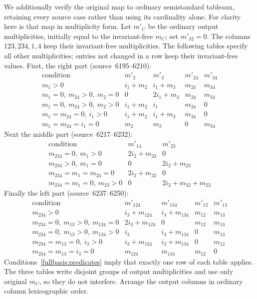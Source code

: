 We additionally verify the original map to ordinary semistandard
tableaux, retaining every source case rather than using its cardinality
alone.  For clarity here is that map in multiplicity form.  Let $m'_C$
be the ordinary output multiplicities, initially equal to the
invariant-free $m_C$; set $m'_{32}=0$.  The columns $123,234,1,4$ keep
their invariant-free multiplicities.  The following tables specify
all other multiplicities; entries not changed in a row keep their
invariant-free values.  First, the right part (source~6195--6210):
\[
\begin{array}{c|cc|cc}
\text{condition}&m'_2&m'_3&m'_{24}&m'_{34}\\\hline
m_1>0&i_1+m_2&i_1+m_3&m_{24}&m_{34}\\
m_1=0,\ m_{24}>0,\ m_2=0&0&2i_1+m_3&m_{24}&m_{34}\\
m_1=0,\ m_{24}>0,\ m_2>0&i_1+m_2&i_1&m_{24}&0\\
m_1=m_{24}=0,\ i_1>0&i_1+m_2&i_1+m_3&m_{34}&0\\
m_1=m_{24}=i_1=0&m_2&m_3&0&m_{34}
\end{array}
\]
Next the middle part (source~6217--6232):
\[
\begin{array}{c|cc}
\text{condition}&m'_{14}&m'_{23}\\\hline
m_{234}=0,\ m_1>0&2i_2+m_{23}&0\\
m_{234}>0,\ m_1=0&0&2i_2+m_{23}\\
m_{234}=m_1=m_{23}=0&2i_2+m_{32}&0\\
m_{234}=m_1=0,\ m_{23}>0&0&2i_2+m_{32}+m_{23}
\end{array}
\]
Finally the left part (source~6237--6250):
\[
\begin{array}{c|cc|cc}
\text{condition}&m'_{124}&m'_{134}&m'_{12}&m'_{13}\\\hline
m_{234}>0&i_3+m_{124}&i_3+m_{134}&m_{12}&m_{13}\\
m_{234}=0,\ m_{13}>0,\ m_{134}=0&2i_3+m_{124}&0&m_{12}&m_{13}\\
m_{234}=0,\ m_{13}>0,\ m_{134}>0&i_3&i_3+m_{134}&0&m_{13}\\
m_{234}=m_{13}=0,\ i_3>0&i_3+m_{124}&i_3+m_{134}&0&m_{12}\\
m_{234}=m_{13}=i_3=0&m_{124}&m_{134}&m_{12}&0
\end{array}
\]
Conditions~\eqref{fullbasis:predicates} imply that exactly one row of
each table applies.  The three tables write disjoint groups of output
multiplicities and use only original $m_C$, so they do not interfere.
Arrange the output columns in ordinary column lexicographic order.

